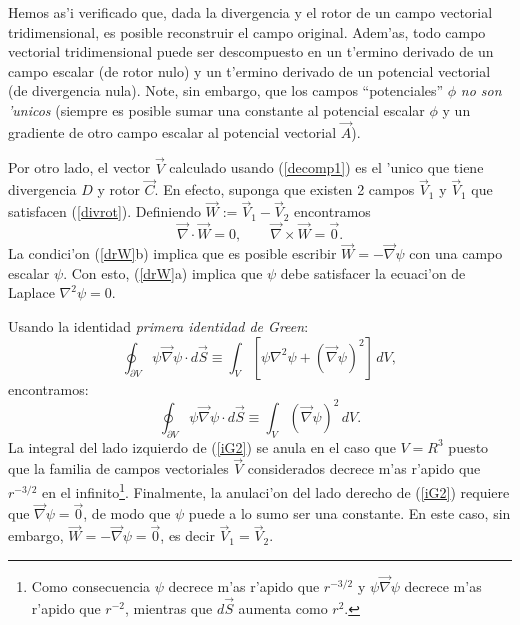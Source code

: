 Hemos as'i verificado que, dada la divergencia y el rotor de un campo vectorial
tridimensional, es posible reconstruir el campo original. Adem'as,
todo campo vectorial tridimensional puede ser descompuesto en un t'ermino
derivado de un campo escalar (de rotor nulo) y un t'ermino derivado de un
potencial vectorial (de divergencia nula). Note, sin embargo, que los campos
``potenciales'' $\phi$ \textit{no son 'unicos} (siempre es posible sumar una
constante al potencial escalar $\phi$ y un gradiente de otro campo escalar al
potencial vectorial $\vec A$).

Por otro lado, el vector $\vec V$ calculado usando (\ref{decomp1}) es el 'unico
que tiene divergencia $D$ y rotor $\vec C$. En efecto, suponga que existen 2
campos $\vec V_1$ y $\vec V_1$ que satisfacen (\ref{divrot}). Definiendo $\vec
W:=\vec V_1-\vec V_2$ encontramos
\begin{equation}
 \vec\nabla\cdot\vec W=0, \qquad \vec\nabla\times\vec W=\vec 0. \label{drW}
\end{equation}
La condici'on (\ref{drW}b) implica que es posible escribir $\vec
W=-\vec\nabla\psi$ con una campo escalar $\psi$. Con esto, (\ref{drW}a) implica
que $\psi$ debe satisfacer la ecuaci'on de Laplace $\nabla^2\psi=0$.

Usando la identidad \textit{primera identidad de Green}:
\begin{equation}
 \oint_{\partial V}\psi \vec\nabla\psi\cdot d\vec S\equiv \int_V
\left[\psi\nabla^2\psi+(\vec\nabla\psi)^2\right]\,dV ,
\end{equation}
encontramos:
\begin{equation}
 \oint_{\partial V}\psi \vec\nabla\psi\cdot d\vec S\equiv \int_V
(\vec\nabla\psi)^2\,dV . \label{iG2}
\end{equation}
La integral del lado izquierdo de (\ref{iG2}) se anula en el caso que $V=R^3$
puesto que la familia de campos vectoriales $\vec V$ considerados decrece m'as
r'apido que $r^{-3/2}$ en el infinito\footnote{Como consecuencia $\psi$
decrece m'as r'apido que $r^{-3/2}$ y $\psi \vec\nabla\psi$ decrece m'as
r'apido que $r^{-2}$, mientras que $d\vec S$ aumenta como $r^2$.}. Finalmente,
la anulaci'on del lado derecho de  (\ref{iG2}) requiere que
$\vec\nabla\psi=\vec 0$, de modo que $\psi$ puede a lo sumo ser una constante.
En este caso, sin embargo, $\vec W=-\vec\nabla\psi=\vec 0$, es decir $\vec
V_1=\vec V_2$.

